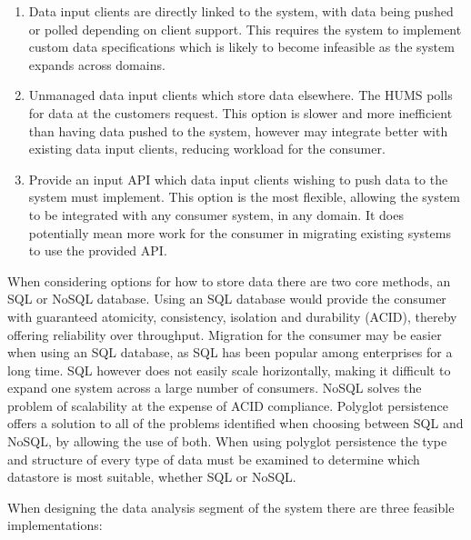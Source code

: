 \documentclass[10pt,a4paper]{article}
\begin{document}
\begin{enumerate}
	\item Data input clients are directly linked to the system, with data being
	      pushed or polled depending on client support. This requires the system
	      to implement custom data specifications which is likely to become
	      infeasible as the system expands across domains.
	\item Unmanaged data input clients which store data elsewhere. The HUMS polls
	      for data at the customers request. This option is slower and more
	      inefficient than having data pushed to the system, however may integrate
	      better with existing data input clients, reducing workload for the
	      consumer.
	\item Provide an input API which data input clients wishing to push data to
	      the system must implement. This option is the most flexible, allowing
	      the system to be integrated with any consumer system, in any domain. It
	      does potentially mean more work for the consumer in migrating existing
	      systems to use the provided API.
\end{enumerate}

When considering options for how to store data there are two core methods, an
SQL or NoSQL database. Using an SQL database would provide the consumer with
guaranteed atomicity, consistency, isolation and durability (ACID), thereby
offering reliability over throughput. Migration for the consumer may be easier
when using an SQL database, as SQL has been popular among enterprises for a long
time. SQL however does not easily scale horizontally, making it difficult to
expand one system across a large number of consumers. NoSQL solves the problem
of scalability at the expense of ACID compliance. Polyglot persistence offers a
solution to all of the problems identified when choosing between SQL and NoSQL,
by allowing the use of both. When using polyglot persistence the type and
structure of every type of data must be examined to determine which datastore is
most suitable, whether SQL or NoSQL.

When designing the data analysis segment of the system there are three feasible
implementations:
\end{document}
